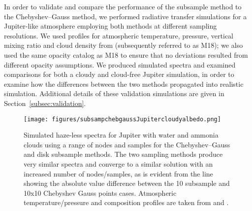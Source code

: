 \documentclass[12pt, letterpaper]{aastex631}
\begin{document}
 In order to validate and compare the performance of the subsample method to the Chebyshev--Gauss method, we performed radiative transfer simulations for a Jupiter-like atmosphere employing both methods at different sampling resolutions. We used profiles for atmospheric temperature, pressure, vertical mixing ratio and cloud density from \textcite{2018ApJ...858...69M} (subsequently referred to as M18); we also used the same opacity catalog as M18 to ensure that no deviations resulted from different opacity assumptions. We produced simulated spectra and examined comparisons for both a cloudy and cloud-free Jupiter simulation, in order to examine how the differences between the two methods propagated into realistic simulation. Additional details of these validation simulations are given in Section~\ref{subsec:validation}. 
 
 \begin{figure*}[b]
  \centering
  \texttt{[image: figures/subsampchebgaussJupitercloudyalbedo.png]}
  \caption{Simulated haze-less spectra for Jupiter with water and ammonia clouds using a range of nodes and samples for the Chebyshev--Gauss and disk subsample methods.  The two sampling methods produce very similar spectra and converge to a similar solution with an increased number of nodes/samples, as is evident from the line showing the absolute value difference between the 10 subsample and 10x10 Chebyshev Gauss points cases.  Atmospheric temperature/pressure and composition profiles are taken from \textcite{1981JGR....86.8721L} and \textcite{2018ApJ...858...69M}.}
  \label{fig:samplingjupcloudy}
\end{figure*}
 
\end{document}

